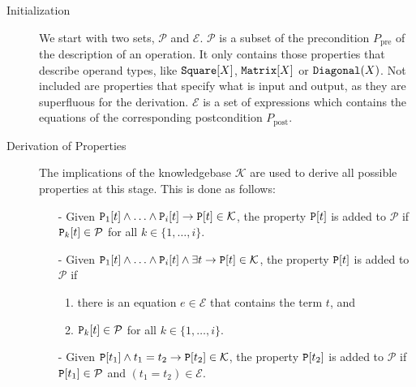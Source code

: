 \begin{description}
\item[Initialization] We start with two sets, $\mathcal{P}$ and $\mathcal{E}$. $\mathcal{P}$ is a subset of the precondition $P_\text{pre}$ of the description of an operation. It only contains those properties that describe operand types, like $\text{\ttfamily Square}[X]$, $\text{\ttfamily Matrix}[X]$ or $\text{\ttfamily Diagonal}(X)$. Not included are properties that specify what is input and output, as they are superfluous for the derivation. $\mathcal{E}$ is a set of expressions which contains the equations of the corresponding postcondition $P_\text{post}$.

\item[Derivation of Properties] The implications of the knowledgebase $\mathcal{K}$ are used to derive all possible properties at this stage. This is done as follows:

\begin{itemize}
\item[-] Given $\text{\ttfamily P}_1[t] \land \ldots \land \text{\ttfamily P}_i[t] \rightarrow \text{\ttfamily P}[t] \in \mathcal{K}$, the property $\text{\ttfamily P}[t]$ is added to $\mathcal{P}$ if $\text{\ttfamily P}_k[t] \in \mathcal{P}$ for all $k \in \{1,\ldots, i\}$.

\item[-] Given $\text{\ttfamily P}_1[t] \land \ldots \land \text{\ttfamily P}_i[t] \land \exists t \rightarrow \text{\ttfamily P}[t] \in \mathcal{K}$, the property $\text{\ttfamily P}[t]$ is added to $\mathcal{P}$ if 
\begin{enumerate}
\item there is an equation $e \in \mathcal{E}$ that contains the term $t$, and
\item $\text{\ttfamily P}_k[t] \in \mathcal{P}$ for all $k \in \{1,\ldots, i\}$.
\end{enumerate}

\item[-] Given $\text{\ttfamily P}[t_1] \land t_1 = t_2 \rightarrow \text{\ttfamily P}[t_2] \in \mathcal{K}$, the property $\text{\ttfamily P}[t_2]$ is added to $\mathcal{P}$ if $\text{\ttfamily P}[t_1] \in \mathcal{P}$ and $(t_1 = t_2) \in \mathcal{E}$.


\end{itemize}
\end{description}
